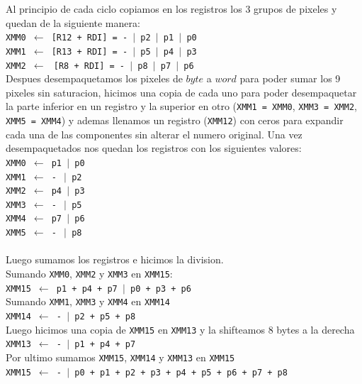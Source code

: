 Al principio de cada ciclo copiamos en los registros los 3 grupos de pixeles y quedan de la siguiente manera:\\

\noindent
\texttt{XMM0 $\gets$ [R12 + RDI] = - $\vert$ p2 $\vert$ p1 $\vert$ p0}\\
\texttt{XMM1 $\gets$ [R13 + RDI] = - $\vert$ p5 $\vert$ p4 $\vert$ p3}\\
\texttt{XMM2 $\gets$ $\ $[R8  + RDI] = - $\vert$ p8 $\vert$ p7 $\vert$ p6}\\

Despues desempaquetamos los pixeles de $byte$ a $word$ para poder sumar los 9 pixeles sin saturacion, hicimos una copia de cada uno para poder desempaquetar la parte inferior en un registro y la superior en otro (\texttt{XMM1 = XMM0}, \texttt{XMM3 = XMM2}, \texttt{XMM5 = XMM4}) y ademas llenamos un registro (\texttt{XMM12}) con ceros para expandir cada una de las componentes sin alterar el numero original.
Una vez desempaquetados nos quedan los registros con los siguientes valores:\\

\noindent
\texttt{XMM0 $\gets$ p1 $\vert$ p0} \\
\texttt{XMM1 $\gets$ - $\ \vert$ p2} \\
\texttt{XMM2 $\gets$ p4 $\vert$ p3} \\
\texttt{XMM3 $\gets$ - $\ \vert$ p5} \\ 
\texttt{XMM4 $\gets$ p7 $\vert$ p6} \\
\texttt{XMM5 $\gets$ - $\ \vert$ p8} \\
\\
Luego sumamos los registros e hicimos la division. \\

Sumando \texttt{XMM0}, \texttt{XMM2} y \texttt{XMM3} en \texttt{XMM15}: \\
	\texttt{XMM15 $\gets$ p1 + p4 + p7 $\vert$ p0 + p3 + p6}	\\

Sumando \texttt{XMM1}, \texttt{XMM3} y \texttt{XMM4} en \texttt{XMM14}	\\
	\texttt{XMM14 $\gets$ - $\vert$ p2 + p5 + p8} \\

Luego hicimos una copia de \texttt{XMM15} en \texttt{XMM13} y la shifteamos 8 bytes a la derecha \\
	\texttt{XMM13 $\gets$ - $\vert$ p1 + p4 + p7} \\

Por ultimo sumamos \texttt{XMM15}, \texttt{XMM14} y \texttt{XMM13} en \texttt{XMM15} \\
	\texttt{XMM15 $\gets$ - $\vert$ p0 + p1 + p2 + p3 + p4 + p5 + p6 + p7 + p8} \\

